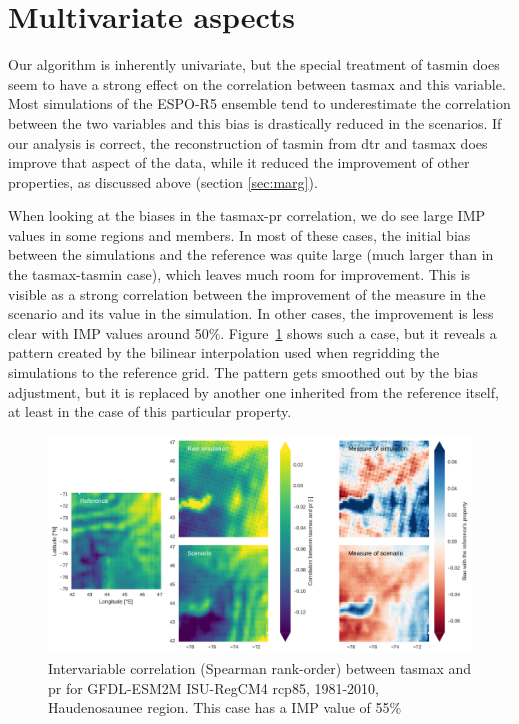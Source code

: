 \documentclass[letterpaper,10pt]{article}
\begin{document}
\section{Multivariate aspects}
Our algorithm is inherently univariate, but the special treatment of tasmin does seem to have a strong effect on the correlation between tasmax and this variable. Most simulations of the ESPO-R5 ensemble tend to underestimate the correlation between the two variables and this bias is drastically reduced in the scenarios. If our analysis is correct, the reconstruction of tasmin from dtr and tasmax does improve that aspect of the data, while it reduced the improvement of other properties, as discussed above (section \ref{sec:marg}).

When looking at the biases in the tasmax-pr correlation, we do see large IMP values in some regions and members. In most of these cases, the initial bias between the simulations and the reference was quite large (much larger than in the tasmax-tasmin case), which leaves much room for improvement. This is visible as a strong correlation between the improvement of the measure in the scenario and its value in the simulation. In other cases, the improvement is less clear with IMP values around 50\%. Figure~\ref{fig:icorr} shows such a case, but it reveals a pattern created by the bilinear interpolation used when regridding the simulations to the reference grid. The pattern gets smoothed out by the bias adjustment, but it is replaced by another one inherited from the reference itself, at least in the case of this particular property.

\begin{figure}
    \centering
    \includegraphics[width=\textwidth]{../images/corr_tasmax_pr_diags.pdf}
    \caption{Intervariable correlation (Spearman rank-order) between tasmax and pr for GFDL-ESM2M ISU-RegCM4 rcp85, 1981-2010, Haudenosaunee region. This case has a IMP value of 55\%}\label{fig:icorr}
\end{figure}
\end{document}

